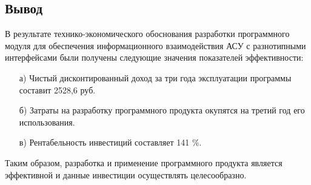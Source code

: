\subsection{Вывод}

В результате технико-экономического обоснования разработки программного модуля для обеспечения информационного взаимодействия АСУ с разнотипными интерфейсами были получены следующие значения показателей эффективности:

\begin{enumerate}
\item[а)] Чистый дисконтированный доход за три года эксплуатации
программы составит 2528,6 руб.
\item[б)] Затраты на разработку программного продукта окупятся на третий
год его использования.
\item[в)] Рентабельность инвестиций составляет 141 \%.
\end{enumerate}

Таким образом, разработка и применение программного продукта является эффективной и данные инвестиции осуществлять целесообразно.
